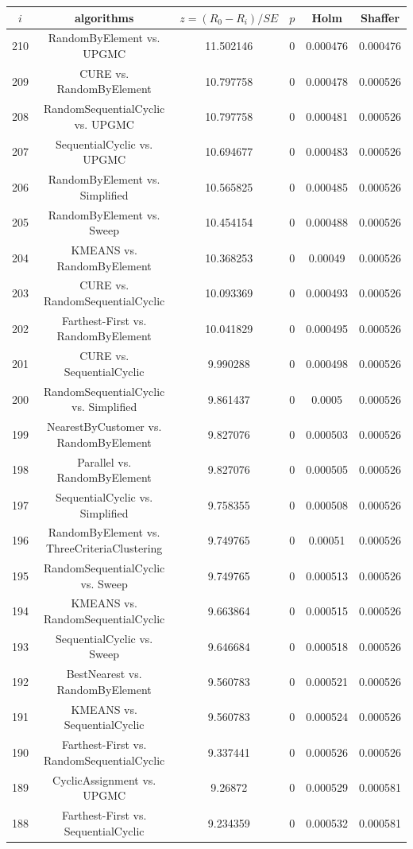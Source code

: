 \documentclass[a4paper,10pt]{article}
\begin{document}
\begin{landscape}
\begin{table}[!htp]
\centering\scriptsize
\begin{tabular}{cccccc}
$i$&algorithms&$z=(R_0 - R_i)/SE$&$p$&Holm&Shaffer\\
\hline210&RandomByElement vs. UPGMC&11.502146&0&0.000476&0.000476\\
209&CURE vs. RandomByElement&10.797758&0&0.000478&0.000526\\
208&RandomSequentialCyclic vs. UPGMC&10.797758&0&0.000481&0.000526\\
207&SequentialCyclic vs. UPGMC&10.694677&0&0.000483&0.000526\\
206&RandomByElement vs. Simplified&10.565825&0&0.000485&0.000526\\
205&RandomByElement vs. Sweep&10.454154&0&0.000488&0.000526\\
204&KMEANS vs. RandomByElement&10.368253&0&0.00049&0.000526\\
203&CURE vs. RandomSequentialCyclic&10.093369&0&0.000493&0.000526\\
202&Farthest-First vs. RandomByElement&10.041829&0&0.000495&0.000526\\
201&CURE vs. SequentialCyclic&9.990288&0&0.000498&0.000526\\
200&RandomSequentialCyclic vs. Simplified&9.861437&0&0.0005&0.000526\\
199&NearestByCustomer vs. RandomByElement&9.827076&0&0.000503&0.000526\\
198&Parallel vs. RandomByElement&9.827076&0&0.000505&0.000526\\
197&SequentialCyclic vs. Simplified&9.758355&0&0.000508&0.000526\\
196&RandomByElement vs. ThreeCriteriaClustering&9.749765&0&0.00051&0.000526\\
195&RandomSequentialCyclic vs. Sweep&9.749765&0&0.000513&0.000526\\
194&KMEANS vs. RandomSequentialCyclic&9.663864&0&0.000515&0.000526\\
193&SequentialCyclic vs. Sweep&9.646684&0&0.000518&0.000526\\
192&BestNearest vs. RandomByElement&9.560783&0&0.000521&0.000526\\
191&KMEANS vs. SequentialCyclic&9.560783&0&0.000524&0.000526\\
190&Farthest-First vs. RandomSequentialCyclic&9.337441&0&0.000526&0.000526\\
189&CyclicAssignment vs. UPGMC&9.26872&0&0.000529&0.000581\\
188&Farthest-First vs. SequentialCyclic&9.234359&0&0.000532&0.000581\\

\end{tabular}
\end{table}
\end{landscape}
\end{document}

